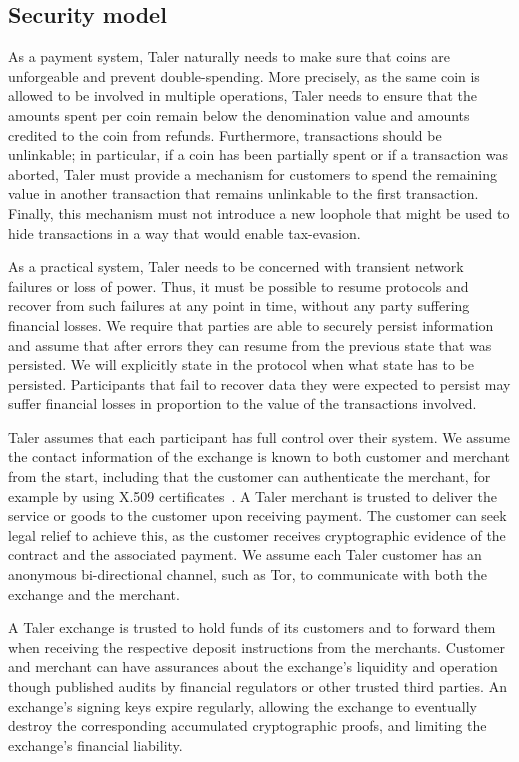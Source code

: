 \documentclass[sigconf, authordraft]{acmart}
\begin{document}
\subsection{Security model}

As a payment system, Taler naturally needs to make sure that coins are
unforgeable and prevent double-spending.  More precisely, as the same
coin is allowed to be involved in multiple operations, Taler needs to
ensure that the amounts spent per coin remain below the denomination
value and amounts credited to the coin from refunds.  Furthermore,
transactions should be unlinkable; in particular, if a coin has been
partially spent or if a transaction was aborted, Taler must provide a
mechanism for customers to spend the remaining value in another
transaction that remains unlinkable to the first transaction.  Finally,
this mechanism must not introduce a new loophole that might be used to
hide transactions in a way that would enable tax-evasion.

As a practical system, Taler needs to be concerned with transient
network failures or loss of power.  Thus, it must be possible to
resume protocols and recover from such failures at any point in time,
without any party suffering financial losses.  We require that parties
are able to securely persist information and assume that after
errors they can resume from the previous state that was persisted.
We will explicitly state in the protocol when what state has
to be persisted.  Participants that fail to recover data they were
expected to persist may suffer financial losses in proportion to the
value of the transactions involved.

Taler assumes that each participant has full control over their
system.  We assume the contact information of the exchange is known to
both customer and merchant from the start, including that the customer
can authenticate the merchant, for example by using X.509
certificates~\cite{rfc6818}.  A Taler merchant is trusted to deliver
the service or goods to the customer upon receiving payment.  The
customer can seek legal relief to achieve this, as the customer
receives cryptographic evidence of the contract and the associated
payment.  We assume each Taler customer has an anonymous
bi-directional channel, such as Tor, to communicate with both the
exchange and the merchant.

A Taler exchange is trusted to hold funds of its customers and to
forward them when receiving the respective deposit instructions from
the merchants.  Customer and merchant can have assurances about the
exchange's liquidity and operation though published audits by
financial regulators or other trusted third parties.  An exchange's
signing keys expire regularly, allowing the exchange to eventually
destroy the corresponding accumulated cryptographic proofs, and
limiting the exchange's financial liability.
\end{document}
